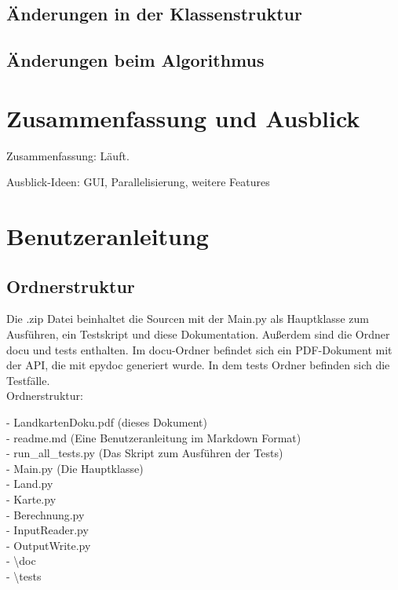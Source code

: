 \documentclass[a4paper,11pt]{article}
\newcommand*{\mybox}[2]{\colorbox{#1!30}{\parbox{.98\linewidth}{#2}}}
\begin{document}
{\subsection{\"Anderungen in der Klassenstruktur}

\subsection{\"Anderungen beim Algorithmus}

\section{Zusammenfassung und Ausblick}


Zusammenfassung: Läuft.

Ausblick-Ideen: GUI, Parallelisierung, weitere Features


\section{Benutzeranleitung}
\subsection{Ordnerstruktur}
Die .zip Datei beinhaltet die Sourcen mit der Main.py als Hauptklasse zum Ausf\"uhren, ein Testskript und diese Dokumentation. Außerdem sind die Ordner \glqq docu\grqq{} und \glqq tests\grqq{} enthalten.
Im \glqq docu\grqq{}-Ordner befindet sich ein PDF-Dokument mit der API, die mit epydoc generiert wurde. In dem tests Ordner befinden sich die Testf\"alle.\\
\vspace{2mm}
Ordnerstruktur:\\
\mybox{background}{
	- LandkartenDoku.pdf (dieses Dokument)\\
	- readme.md (Eine Benutzeranleitung im Markdown Format)\\
	- run\_all\_tests.py (Das Skript zum Ausf\"uhren der Tests)\\
	- Main.py (Die Hauptklasse)\\
	- Land.py\\
	- Karte.py\\
	- Berechnung.py\\
	- InputReader.py\\
	- OutputWrite.py\\
	- \textbackslash doc\\
	- \textbackslash tests
}
}
\end{document}
